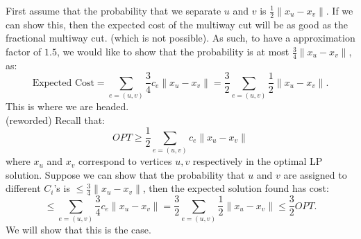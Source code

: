 \documentclass[../main/main.tex]{subfiles}
\begin{document}
First assume that the probability that we separate $u$ and $v$ is $\frac{1}{2}\|x_u-x_v\|$. If we can show this, then the expected cost of the multiway cut will be as good as the fractional multiway cut. (which is not possible). As such, to have a approximation factor of $1.5$, we would like to show that the probability is at most $\frac{3}{4}\|x_u-x_v\|$, as: \[
	\text{Expected Cost} = \sum_{e=(u,v)} \frac{3}{4}c_e \|x_u-x_v\|=\frac{3}{2}\sum_{e=(u,v)} \frac{1}{2} \|x_u-x_v\|
.\] This is where we are headed. \\

(reworded) Recall that:  \[
	OPT \ge  \frac{1}{2}\sum_{e=(u,v)} c_e \|x_u-x_v\|
\] where $x_u$ and $x_v$ correspond to vertices $u,v $ respectively in the optimal LP solution. Suppose we can show that the probability that $u$ and $v$ are assigned to different $C_i$'s is $\le \frac{3}{4}\|x_u-x_v\|$, then the expected solution found has cost:  \[
\le \sum_{e=(u,v)}\frac{3}{4}c_e \|x_u-x_v\|=\frac{3}{2}\sum_{e=(u,v)}\frac{1}{2}\|x_u-x_v\|\le \frac{3}{2}OPT
.\] We will show that this is the case.
\end{document}
